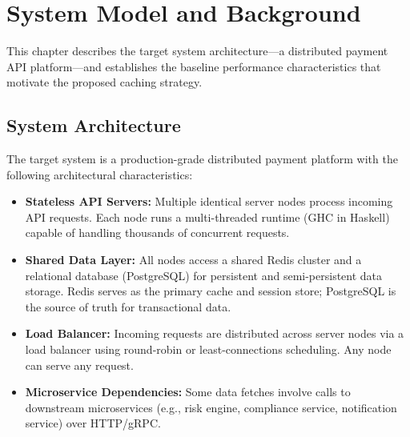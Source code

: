 \documentclass[12pt,a4paper]{report}
\begin{document}
\chapter{System Model and Background}

This chapter describes the target system architecture—a distributed payment API platform—and establishes the baseline performance characteristics that motivate the proposed caching strategy.

\section{System Architecture}

The target system is a production-grade distributed payment platform with the following architectural characteristics:

\begin{itemize}
    \item \textbf{Stateless API Servers:} Multiple identical server nodes process incoming API requests. Each node runs a multi-threaded runtime (GHC in Haskell) capable of handling thousands of concurrent requests.

    \item \textbf{Shared Data Layer:} All nodes access a shared Redis cluster and a relational database (PostgreSQL) for persistent and semi-persistent data storage. Redis serves as the primary cache and session store; PostgreSQL is the source of truth for transactional data.

    \item \textbf{Load Balancer:} Incoming requests are distributed across server nodes via a load balancer using round-robin or least-connections scheduling. Any node can serve any request.

    \item \textbf{Microservice Dependencies:} Some data fetches involve calls to downstream microservices (e.g., risk engine, compliance service, notification service) over HTTP/gRPC.
\end{itemize}
\end{document}
